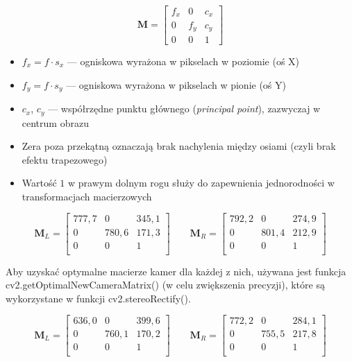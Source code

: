 \documentclass[magisterska]{pracadypl}
\begin{document}
\[
\mathbf{M} =
\begin{bmatrix}
f_x & 0 & c_x \\
0 & f_y & c_y \\
0 & 0 & 1
\end{bmatrix}
\]

\begin{itemize}
  \item $f_x = f \cdot s_x$ — ogniskowa wyrażona w pikselach w poziomie (oś X)
  \item $f_y = f \cdot s_y$ — ogniskowa wyrażona w pikselach w pionie (oś Y)
  \item $c_x$, $c_y$ — współrzędne punktu głównego (\textit{principal point}), zazwyczaj w centrum obrazu
  \item Zera poza przekątną oznaczają brak nachylenia między osiami (czyli brak efektu trapezowego)
  \item Wartość $1$ w prawym dolnym rogu służy do zapewnienia jednorodności w transformacjach macierzowych
\end{itemize}

\[
\mathbf{M}_L =
\begin{bmatrix}
777,7 & 0 & 345,1 \\
0 & 780,6 & 171,3 \\
0 & 0 & 1 \\
\end{bmatrix}
\qquad
\mathbf{M}_R =
\begin{bmatrix}
792,2 & 0 & 274,9 \\
0 & 801,4 & 212,9 \\
0 & 0 & 1 \\
\end{bmatrix}
\]

Aby uzyskać optymalne macierze kamer dla każdej z nich, używana jest funkcja \\ 
cv2.getOptimalNewCameraMatrix() (w celu zwiększenia precyzji), które są wykorzystane w funkcji cv2.stereoRectify().

\[
\mathbf{M}_L =
\begin{bmatrix}
636,0 & 0 & 399,6 \\
0 & 760,1 & 170,2 \\
0 & 0 & 1 \\
\end{bmatrix}
\qquad
\mathbf{M}_R =
\begin{bmatrix}
772,2 & 0 & 284,1 \\
0 & 755,5 & 217,8 \\
0 & 0 & 1 \\
\end{bmatrix}
\]
\end{document}
